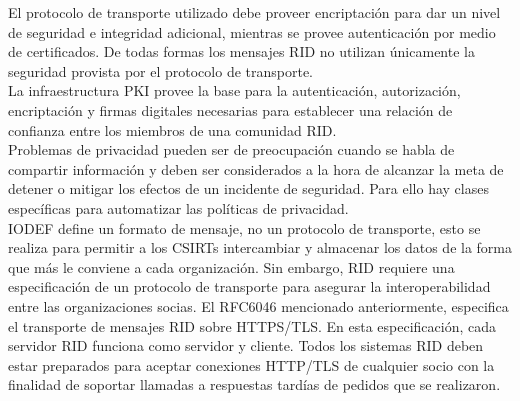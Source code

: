 El protocolo de transporte utilizado debe proveer encriptación para dar un nivel 
de seguridad e integridad adicional, mientras se provee autenticación por medio 
de certificados. De todas formas los mensajes RID no utilizan únicamente la 
seguridad provista por el protocolo de transporte.\\

La infraestructura PKI provee la base para la autenticación, autorización, 
encriptación y firmas digitales necesarias para establecer una relación de 
confianza entre los miembros de una comunidad RID.\\

Problemas de privacidad pueden ser de preocupación cuando se habla de compartir 
información y deben ser considerados a la hora de alcanzar la meta de detener o 
mitigar los efectos de un incidente de seguridad. Para ello hay clases 
específicas para automatizar las políticas de privacidad.\\

IODEF define un formato de mensaje, no un protocolo de transporte, esto se 
realiza para permitir a los CSIRTs intercambiar y almacenar los datos de la 
forma que más le conviene a cada organización. Sin embargo, RID requiere una 
especificación de un protocolo de transporte para asegurar la interoperabilidad 
entre las organizaciones socias. El RFC6046 mencionado anteriormente, especifica 
el transporte de mensajes RID sobre HTTPS/TLS. En esta especificación, cada 
servidor RID funciona como servidor y cliente. Todos los sistemas RID deben 
estar preparados para aceptar conexiones HTTP/TLS de cualquier socio con la 
finalidad de soportar llamadas a respuestas tardías de pedidos que se 
realizaron.












